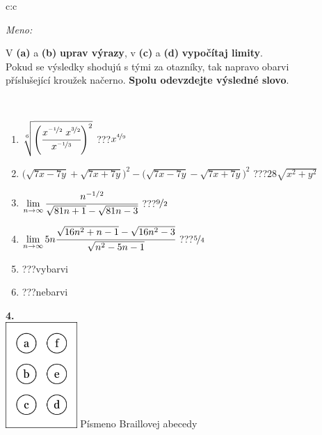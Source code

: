 \documentclass[10pt]{report}
\begin{document}
\begin{tabular}{c:c}
\begin{minipage}[c][104.5mm][t]{0.5\linewidth}
\begin{center}
\textit{Meno:}\phantom{xxxxxxxxxxxxxxxxxxxxxxxxxxxxxxxxxxxxxxxxxxxxxxxxxxxxxxxxxxxxxxxxx}\\[5mm]
\begin{minipage}{0.95\linewidth}
\begin{center}
V \textbf{(a)} a \textbf{(b)} \textbf{uprav výrazy}, v \textbf{(c)} a \textbf{(d)} \textbf{vypočítaj limity}.\\Pokud se výsledky shodujú s tými za otazníky, tak napravo obarvi\\příslušející kroužek načerno. \textbf{Spolu odevzdejte výsledné slovo}.
\end{center}
\end{minipage}
\\[1mm]
\begin{minipage}{0.79\linewidth}
\begin{center}
\begin{varwidth}{\linewidth}
\begin{enumerate}
\small
\item $\sqrt[6]{\left(\cfrac{x^{\nicefrac{-1}{2}}\;x^{\nicefrac{3}{2}}}{x^{\nicefrac{-1}{3}}}\right)^{2}}$\quad \dotfill\; ???\;\dotfill \quad $x^{\nicefrac{4}{9}}$
\item {\footnotesize{\scriptsize$\big(\sqrt{7x-7y}+\sqrt{7x+7y}\big)^2-\big(\sqrt{7x-7y}-\sqrt{7x+7y}\big)^2$}\quad \dotfill\; ???\;\dotfill \quad $28\sqrt{x^2+y^2}$}
\item $\lim\limits_{n\to\infty}\cfrac{n^{-1/2}}{\sqrt{81n+1}-\sqrt{81n-3}}$\quad \dotfill\; ???\;\dotfill \quad $\nicefrac{9}{2}$
\item $\lim\limits_{n\to\infty}5n\cfrac{\sqrt{16n^2+n-1}-\sqrt{16n^2-3}}{\sqrt{n^2-5n-1}}$\quad \dotfill\; ???\;\dotfill \quad $\nicefrac{5}{4}$
\item \quad \dotfill\; ???\;\dotfill \quad vybarvi
\item \quad \dotfill\; ???\;\dotfill \quad nebarvi
\end{enumerate}
\end{varwidth}
\end{center}
\end{minipage}
\begin{minipage}{0.20\linewidth}
\begin{center}
{\Huge\bfseries 4.} \\[2mm]
\includegraphics[height=40mm]{../images/braille.png}
{\small Písmeno Braillovej abecedy}
\end{center}
\end{minipage}
\end{center}
\end{minipage}
%
\end{tabular}
\end{document}
